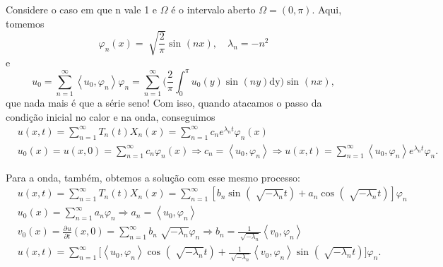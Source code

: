 \documentclass[../pde_notes.tex]{subfiles}
\begin{document}
\begin{example}
	Considere o caso em que n vale 1 e \(\Omega \) é o intervalo aberto \(\Omega = (0, \pi )\). Aqui, tomemos
	\[
		\varphi_{n}(x) = \sqrt[]{\frac{2}{\pi }}\sin^{}{(nx)},\quad \lambda_{n} = -n^{2}
	\]
	e
	\[
		u_{0} = \sum\limits_{n=1}^{\infty}\left< u_{0}, \varphi_{n} \right>\varphi_{n} = \sum\limits_{n=1}^{\infty}\biggl(\frac{2}{\pi }\int_{0}^{\pi }u_{0}(y)\sin^{}{(ny)} \mathrm{dy}\biggr)\sin^{}{(nx)},
	\]
	que nada mais é que a série seno! Com isso, quando atacamos o passo da condição inicial no calor e na onda, conseguimos
	\begin{align*}
		 & u(x,t) = \sum\limits_{n=1}^{\infty}T_{n}(t)X_{n}(x) = \sum\limits_{n=1}^{\infty}c_{n}e^{\lambda_{n}t}\varphi_{n}(x)                                                                                                               \\
		 & u_{0}(x) = u(x, 0) = \sum\limits_{n=1}^{\infty}c_{n}\varphi_{n}(x) \Rightarrow c_{n}=\left< u_{0}, \varphi_{n} \right> \Rightarrow u(x,t)=\sum\limits_{n=1}^{\infty}\left< u_{0}, \varphi_{n} \right>e^{\lambda_{n}t}\varphi_{n}.
	\end{align*}

	Para a onda, também, obtemos a solução com esse mesmo processo:
	\begin{align*}
		 & u(x,t) = \sum\limits_{n=1}^{\infty}T_{n}(t)X_{n}(x) = \sum\limits_{n=1}^{\infty}[b_{n}\sin^{}{(\sqrt[]{-\lambda_{n}}t)} + a_{n}\cos^{}{(\sqrt[]{-\lambda_{n}}t)}]\varphi_{n}                                                       \\
		 & u_{0}(x) = \sum\limits_{n=1}^{\infty}a_{n}\varphi_{n} \Rightarrow a_{n} = \left< u_{0}, \varphi_{n} \right>                                                                                                                        \\
		 & v_{0}(x) = \frac{\partial^{}u}{\partial t^{}}(x, 0) = \sum\limits_{n=1}^{\infty}b_{n}\sqrt[]{-\lambda_{n}}\varphi_{n} \Rightarrow b_{n} = \frac{1}{\sqrt[]{-\lambda_{n}}}\left< v_{0}, \varphi_{n} \right>                         \\
		 & u(x,t) = \sum\limits_{n=1}^{\infty}\biggl[\left< u_{0}, \varphi_{n} \right>\cos^{}{(\sqrt[]{-\lambda_{n}}t)} + \frac{1}{\sqrt[]{-\lambda_{n}}}\left<v_{0}, \varphi_{n} \right>\sin^{}{(\sqrt[]{-\lambda_{n}}t)}\biggr]\varphi_{n}.
	\end{align*}
\end{example}
\end{document}
